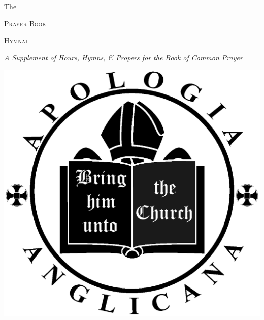 \documentclass[10pt]{book}
\begin{document}
\begin{titlepage}
		\begin{center}
			{\Large{The}}
			\par
			\vspace{.4cm}
			{\Huge{\scshape Prayer Book}}
			\par
			\vspace{.4cm}
			{\Huge{\scshape Hymnal}}
			\par
			\vspace{.4cm}
			{\large{\textit{A Supplement of Hours, Hymns, \& Propers for the Book of Common Prayer}}}
			\par
			\vfill
   	        \includegraphics[scale=.17]{logo.eps}
		\end{center}
	\end{titlepage}
\cleardoublepage
{}
\tableofcontents
{}%
\clearpage


%
%
%

%
\end{document}
